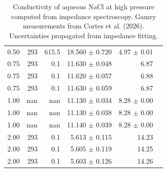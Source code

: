 \begin{table}[ht]
\begin{tabular}{lrrrrr}
0.50 & 293 & 615.5 & 18.560 $\pm$ 0.720 & 4.97 $\pm$ 0.01 \\
0.75 & 293 & 0.1 & 11.630 $\pm$ 0.048 & 6.87 \\
0.75 & 293 & 0.1 & 11.620 $\pm$ 0.057 & 6.88 \\
0.75 & 293 & 0.1 & 11.630 $\pm$ 0.059 & 6.87 \\
1.00 & nan & nan & 11.130 $\pm$ 0.034 & 8.28 $\pm$ 0.00 \\
1.00 & nan & nan & 11.130 $\pm$ 0.038 & 8.28 $\pm$ 0.00 \\
1.00 & nan & nan & 11.140 $\pm$ 0.039 & 8.28 $\pm$ 0.00 \\
2.00 & 293 & 0.1 & 5.613 $\pm$ 0.115 & 14.23 \\
2.00 & 293 & 0.1 & 5.605 $\pm$ 0.119 & 14.25 \\
2.00 & 293 & 0.1 & 5.603 $\pm$ 0.126 & 14.26 \\
\hline
\end{tabular}
\caption{Conductivity of aqueous NaCl at high pressure computed from impedance spectroscopy. Gamry measurements from Cortes et al. (2026). Uncertainties propagated from impedance fitting.}
\label{tab:NaClCortes}
\end{table}
